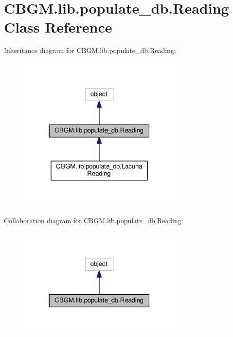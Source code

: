 \hypertarget{classCBGM_1_1lib_1_1populate__db_1_1Reading}{}\section{C\+B\+G\+M.\+lib.\+populate\+\_\+db.\+Reading Class Reference}
\label{classCBGM_1_1lib_1_1populate__db_1_1Reading}


Inheritance diagram for C\+B\+G\+M.\+lib.\+populate\+\_\+db.\+Reading\+:
\nopagebreak
\begin{figure}[H]
\begin{center}
\leavevmode
\includegraphics[width=234pt]{classCBGM_1_1lib_1_1populate__db_1_1Reading__inherit__graph}
\end{center}
\end{figure}


Collaboration diagram for C\+B\+G\+M.\+lib.\+populate\+\_\+db.\+Reading\+:
\nopagebreak
\begin{figure}[H]
\begin{center}
\leavevmode
\includegraphics[width=234pt]{classCBGM_1_1lib_1_1populate__db_1_1Reading__coll__graph}
\end{center}
\end{figure}
